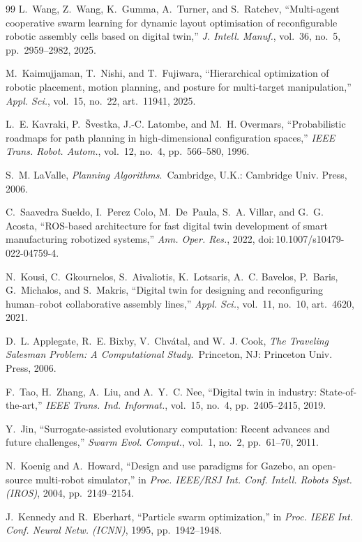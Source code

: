 \documentclass[conference]{IEEEtran}
\begin{document}
\begin{thebibliography}{99}
L.~Wang, Z.~Wang, K.~Gumma, A.~Turner, and S.~Ratchev, ``Multi-agent cooperative swarm learning for
dynamic layout optimisation of reconfigurable robotic assembly cells based on digital twin,''
\emph{J. Intell. Manuf.}, vol.~36, no.~5, pp.~2959--2982, 2025.

M.~Kaimujjaman, T.~Nishi, and T.~Fujiwara, ``Hierarchical optimization of robotic placement, motion
planning, and posture for multi-target manipulation,'' \emph{Appl. Sci.}, vol.~15, no.~22,
art.~11941, 2025.

L.~E. Kavraki, P.~\v{S}vestka, J.-C. Latombe, and M.~H. Overmars, ``Probabilistic roadmaps for path
planning in high-dimensional configuration spaces,'' \emph{IEEE Trans. Robot. Autom.}, vol.~12,
no.~4, pp.~566--580, 1996.

S.~M. LaValle, \emph{Planning Algorithms}.\ Cambridge, U.K.: Cambridge Univ. Press, 2006.

C.~Saavedra Sueldo, I.~Perez Colo, M.~De~Paula, S.~A. Villar, and G.~G. Acosta, ``ROS-based
architecture for fast digital twin development of smart manufacturing robotized systems,''
\emph{Ann. Oper. Res.}, 2022, doi:\,10.1007/s10479-022-04759-4.

N.~Kousi, C.~Gkournelos, S.~Aivaliotis, K.~Lotsaris, A.~C. Bavelos, P.~Baris, G.~Michalos, and
S.~Makris, ``Digital twin for designing and reconfiguring human--robot collaborative assembly
lines,'' \emph{Appl. Sci.}, vol.~11, no.~10, art.~4620, 2021.

D.~L. Applegate, R.~E. Bixby, V.~Chv\'atal, and W.~J. Cook, \emph{The Traveling Salesman Problem: A
Computational Study}.\ Princeton, NJ: Princeton Univ. Press, 2006.

F.~Tao, H.~Zhang, A.~Liu, and A.~Y.~C. Nee, ``Digital twin in industry: State-of-the-art,''
\emph{IEEE Trans. Ind. Informat.}, vol.~15, no.~4, pp.~2405--2415, 2019.

Y.~Jin, ``Surrogate-assisted evolutionary computation: Recent advances and future challenges,''
\emph{Swarm Evol. Comput.}, vol.~1, no.~2, pp.~61--70, 2011.

N.~Koenig and A.~Howard, ``Design and use paradigms for Gazebo, an open-source multi-robot
simulator,'' in \emph{Proc. IEEE/RSJ Int. Conf. Intell. Robots Syst. (IROS)}, 2004,
pp.~2149--2154.

J.~Kennedy and R.~Eberhart, ``Particle swarm optimization,'' in \emph{Proc. IEEE Int. Conf. Neural
Netw. (ICNN)}, 1995, pp.~1942--1948.


\end{thebibliography}
\end{document}
